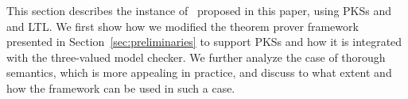 This section describes the instance of \NAME\ proposed in this paper, using PKSs and and LTL. We first show how we modified the theorem prover framework presented in Section~\ref{sec:preliminaries} to support PKSs and how it is integrated with the three-valued model checker. We further analyze the case of thorough semantics, which is more appealing in practice, and discuss to what extent and how the framework can be used in such a case.















